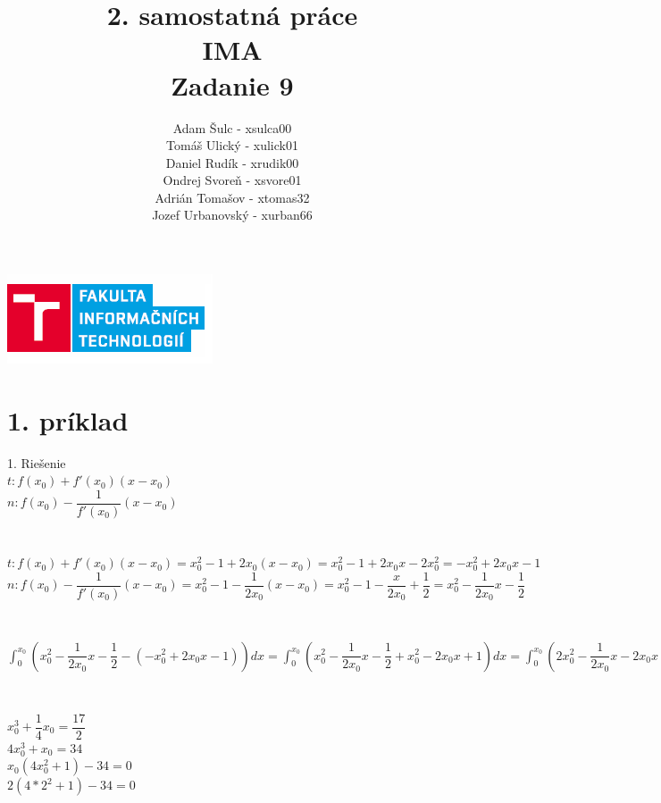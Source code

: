 \documentclass[a4paper]{article}
\title{\textbf{2. samostatná práce\\IMA\\Zadanie 9}}
\author{Adam Šulc - xsulca00\\ Tomáš Ulický - xulick01\\ Daniel Rudík - xrudik00\\ Ondrej Svoreň - xsvore01\\ Adrián Tomašov - xtomas32\\ Jozef Urbanovský - xurban66}
\date{}
\begin{document}
	\maketitle
	\begin{center}
		\includegraphics[clip]{FIT.png}
	\end{center}
	\newpage
	\section*{1. príklad}
		1.  Riešenie\\	
		$t: f(x_0) + f'(x_0)(x - x_0)$ \\
		$n: f(x_0) - \dfrac{1} {f'(x_0)}(x - x_0)$\\
		\\
		\\
		$t: f(x_0) + f'(x_0)(x - x_0) = x_0^2-1+2x_0(x-x_0) = x_0^2-1+2x_0x-2x_0^2 = -x_0^2+2x_0x-1$ \\
		$n: f(x_0) - \dfrac{1} {f'(x_0)}(x - x_0) = x_0^2-1-\dfrac{1} {2x_0}(x-x_0) = x_0^2-1-\dfrac{x} {2x_0}+\dfrac{1}{2} = x_0^2 - \dfrac{1}{2x_0}x - \dfrac{1}{2}$\\
		\\
		\\	
		$
		\int_{0}^{x_0} 
		(x_0^2 - \dfrac{1}{2x_0}x - \dfrac{1}{2} - (-x_0^2+2x_0x-1)) dx =
		\int_{0}^{x_0} 
		(x_0^2 - \dfrac{1}{2x_0}x - \dfrac{1}{2} + x_0^2-2x_0x+1) dx =
		\int_{0}^{x_0} 
		(2x_0^2 - \dfrac{1}{2x_0}x -2x_0x+ \dfrac{1}{2} ) dx =
		2x_0^2\int_{0}^{x_0}1dx - \dfrac{1}{2x_0}\int_{0}^{x_0}xdx -2x_0\int_{0}^{x_0}xdx+ 	\dfrac{1}{2}\int_{0}^{x_0}1dx =
		\left[2x_0^2x - \dfrac{1}{2x_0}\dfrac{x^2}{2} - 2x_0\dfrac{x^2}{2} + \dfrac{1}{2}x\right]_0^{x_0} = \left(2x_0^3 - \dfrac{x_0^2}{4x_0} - \dfrac{2x_0^3}{2} + \dfrac{1}{2}x_0\right) - 0 =
		2x_0^3 - \dfrac{x_0}{4} - x_0^3 + \dfrac{1}{2}x_0 = x_0^3 - \dfrac{x_0}{4} + \dfrac{x_0}{2} = x_0^3 + \dfrac{1}{4}x_0
		$
		\\
		\\
		\\
		$x_0^3 + \dfrac{1}{4}x_0 = \dfrac{17}{2}$ \\
		$4x_0^3 +x_0 = 34$\\
		$x_0(4x_0^2+1) - 34 = 0$\\
		$2(4*2^2 + 1) -34 = 0$\\
\end{document}
